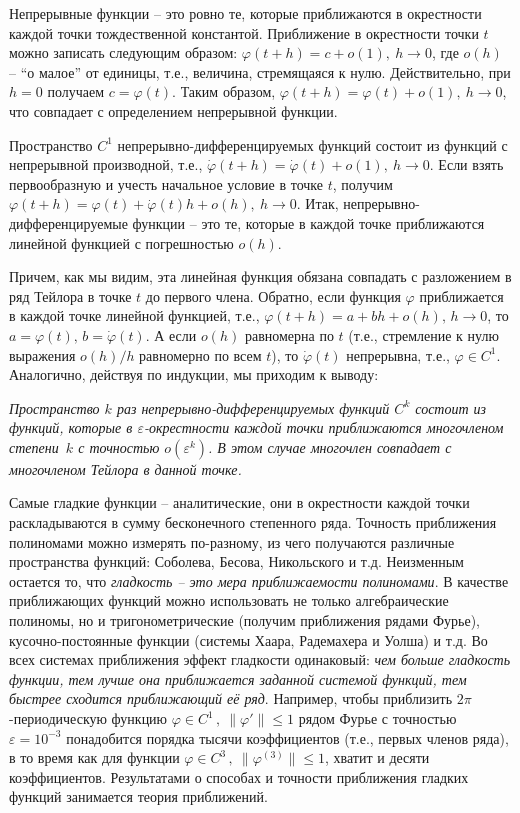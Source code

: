 \documentclass[12pt,a4paper]{article}
\begin{document}
 Непрерывные функции -- это ровно те, которые приближаются в окрестности каждой точки тождественной константой.
 Приближение в окрестности точки $t$ можно записать следующим образом: $\varphi(t+h) = c + o(1), \ h \to 0$,
 где $o(h)$ -- ``о малое'' от единицы, т.е., величина, стремящаяся к нулю.
 Действительно, при $h=0$ получаем $c  = \varphi(t)$. Таким образом, $\varphi(t+h) = \varphi (t)  + o(1), \ h \to 0$,
 что совпадает с определением непрерывной функции.

Пространство $C^1$ непрерывно-дифференцируемых функций состоит из функций с непрерывной производной,
т.е., $\dot \varphi(t+h) = \dot \varphi (t)  + o(1), \ h \to 0$. Если взять первообразную и учесть начальное условие
в точке $t$, получим ${\varphi (t+h) = \varphi(t) + \dot \varphi(t)h + o(h), \ h \to 0}$.
Итак, непрерывно-дифференцируемые функции -- это те, которые в каждой точке приближаются линейной функцией
с погрешностью $o(h)$.

Причем, как мы видим, эта линейная функция обязана совпадать с разложением в ряд Тейлора в точке $t$
до первого члена. Обратно, если функция $\varphi$ приближается в каждой точке
линейной функцией, т.е.,  $\varphi(t+h) = a + bh + o(h), \, h\to 0$, то $a = \varphi (t), \, b = \dot \varphi(t)$.
А если $o(h)$ равномерна по $t$ (т.е., стремление к нулю выражения $o(h)/h$ равномерно по всем $t$), то
$\dot \varphi(t)$ непрерывна, т.е., $\varphi \in C^1$.  Аналогично, действуя по индукции, мы приходим к выводу:
\smallskip

{\em Пространство $k$ раз непрерывно-дифференцируемых функций $C^k$
состоит из функций, которые в $\varepsilon$-окрестности каждой точки приближаются многочленом степени~$k$
с точностью $o(\varepsilon^k)$.
В этом случае многочлен совпадает с многочленом Тейлора в данной точке.}
\smallskip

Самые гладкие функции -- аналитические, они в окрестности каждой точки раскладываются в сумму бесконечного степенного ряда. Точность приближения полиномами можно измерять по-разному, из чего получаются различные пространства функций:
Соболева, Бесова, Никольского и т.д. Неизменным остается то, что {\em гладкость -- это мера приближаемости полиномами}.
В качестве приближающих функций можно использовать не только алгебраические полиномы, но и тригонометрические
(получим приближения рядами Фурье), кусочно-постоянные функции (системы Хаара, Радемахера и Уолша) и т.д.
Во всех системах приближения эффект гладкости одинаковый: {\em чем больше гладкость функции, тем лучше она приближается
заданной системой функций, тем быстрее сходится приближающий её ряд}. Например, чтобы приблизить $2\pi$-периодическую функцию $\varphi\in C^1\, , \ \|\varphi'\| \le 1$ рядом Фурье с точностью $\varepsilon = 10^{-3}$ понадобится порядка тысячи коэффициентов (т.е., первых членов ряда), в то время как для функции $\varphi\in C^3\, , \ \|\varphi^{(3)}\|\le 1$,
 хватит и десяти коэффициентов. Результатами о способах и точности приближения гладких функций занимается теория
 приближений.
\end{document}
